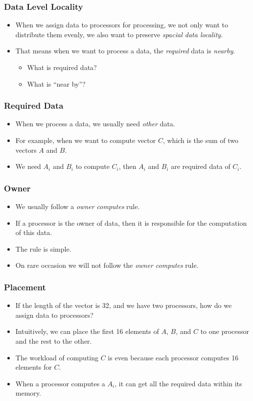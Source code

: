 \documentclass{beamer}
\begin{document}
\begin{CJK}{UTF8}{bsmi}
\begin{frame}
\frametitle{Data Level Locality}
\begin{itemize}
\item When we assign data to processors for processing, we not only
  want to distribute them evenly, we also want to preserve {\em
    spacial data locality}.
\item That means when we want to process a data, the {\em required}
  data is {\em nearby}.
\begin{itemize}
\item What is required data?
\item What is ``near by''?
\end{itemize}
\end{itemize}
\end{frame}

\begin{frame}
\frametitle{Required Data}
\begin{itemize}
\item When we process a data, we usually need {\em other} data.
\item For example, when we want to compute vector $C$, which is the
  sum of two vectors $A$ and $B$.
\item We need $A_i$ and $B_i$ to compute $C_i$, then $A_i$ and $B_i$
  are required data of $C_i$.
\end{itemize}
\end{frame}

\begin{frame}
\frametitle{Owner}
\begin{itemize}
\item We usually follow a {\em owner computes} rule.
\item If a processor is the owner of data, then it is responsible for the computation of this data.
\item The rule is simple.
\item On rare occasion we will not follow the {\em owner computes} rule.
\end{itemize}
\end{frame}

\begin{frame}
\frametitle{Placement}
\begin{itemize}
\item If the length of the vector is 32, and we have two processors, how do we assign data to processors?
\item Intuitively, we can place the first 16 elements of $A$, $B$, and $C$ to one processor and the rest to the other.
\item The workload of computing $C$ is even because each processor computes 16 elements for $C$.
\item When a processor computes a $A_i$, it can get all the required data within its memory.
\end{itemize}
\end{frame}


\end{CJK}
\end{document}
